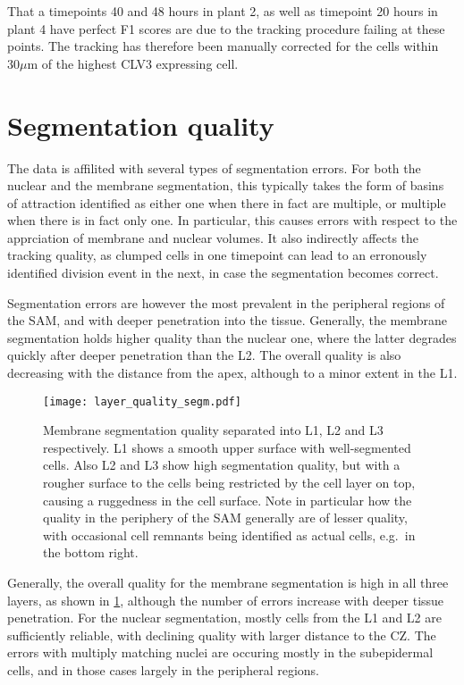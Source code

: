 That a timepoints 40 and 48 hours in plant 2, as well as timepoint 20 hours in
plant 4 have perfect F1 scores are due to the tracking procedure failing at
these points. The tracking has therefore been manually corrected for the cells
within $30\mu$m of the highest CLV3 expressing cell.

\section{Segmentation quality}
\label{sec:data_errors_segmentation}
The data is affilited with several types of segmentation errors. For both the
nuclear and the membrane segmentation, this typically takes the form of basins
of attraction identified as either one when there in fact are multiple, or
multiple when there is in fact only one. In particular, this causes errors with
respect to the apprciation of membrane and nuclear volumes. It also indirectly
affects the tracking quality, as clumped cells in one timepoint can lead to an
erronously identified division event in the next, in case the segmentation
becomes correct. 

Segmentation errors are however the most prevalent in the peripheral regions of
the SAM, and with deeper penetration into the tissue. Generally, the membrane
segmentation holds higher quality than the nuclear one, where the latter
degrades quickly after deeper penetration than the L2. The overall quality is
also decreasing with the distance from the apex, although to a minor extent in
the L1. 

\begin{figure}[H]
  \centering
  \texttt{[image: layer\_quality\_segm.pdf]}
  \caption[Membrane segmentation quality per layer]{Membrane segmentation
    quality separated into L1, L2 and L3 respectively. L1 shows a smooth upper
    surface with well-segmented cells. Also L2 and L3 show high segmentation
    quality, but with a rougher surface to the cells being restricted by the
    cell layer on top, causing a ruggedness in the cell surface. Note in
    particular how the quality in the periphery of the SAM generally are of
    lesser quality, with occasional cell remnants being identified as actual
    cells, e.g.\ in the bottom right.}
  \label{fig:layer_quality_segm}
\end{figure}

Generally, the overall quality for the membrane segmentation is high in all
three layers, as shown in \cref{fig:layer_quality_segm}, although the number of errors increase with deeper tissue
penetration. For the nuclear segmentation, mostly cells from the L1 and L2 are
sufficiently reliable, with declining quality with larger distance to the CZ.
The errors with multiply matching nuclei are occuring mostly in the subepidermal
cells, and in those cases largely in the peripheral regions.










